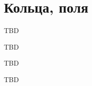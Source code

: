 \section{Кольца, поля}

\begin{definition}[Кольцо]
TBD
\end{definition}

\begin{definition}[Поле]
TBD
\end{definition}

\begin{example}
TBD
\end{example}

\begin{example}
TBD
\end{example}
